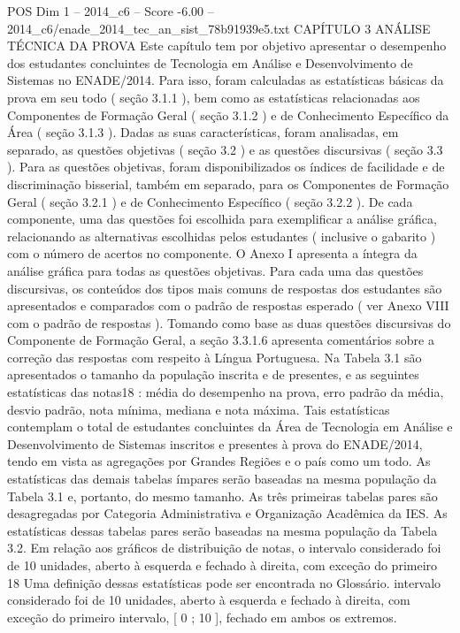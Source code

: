 \begin{textsample}{POS Dim 1 – 2014\_c6 – Score -6.00 – 2014\_c6/enade\_2014\_tec\_an\_sist\_78b91939e5.txt}  \label{ex:f1_pos_421}
CAPÍTULO 3 ANÁLISE TÉCNICA DA PROVA Este capítulo tem por objetivo apresentar o desempenho dos estudantes concluintes de Tecnologia em Análise e Desenvolvimento de Sistemas no ENADE/2014.
Para isso, foram calculadas as estatísticas básicas da prova em seu todo ( seção 3.1.1 ), bem como as estatísticas relacionadas aos Componentes de Formação Geral ( seção 3.1.2 ) e de Conhecimento Específico da Área ( seção 3.1.3 ).
Dadas as suas características, foram analisadas, em separado, as questões objetivas ( seção 3.2 ) e as questões discursivas ( seção 3.3 ).
Para as questões objetivas, foram disponibilizados os índices de facilidade e de discriminação bisserial, também em separado, para os Componentes de Formação Geral ( seção 3.2.1 ) e de Conhecimento Específico ( seção 3.2.2 ).
De cada componente, uma das questões foi escolhida para exemplificar a análise gráfica, relacionando as alternativas escolhidas pelos estudantes ( inclusive o gabarito ) com o número de acertos no componente.
O Anexo I apresenta a íntegra da análise gráfica para todas as questões objetivas.
Para cada uma das questões discursivas, os conteúdos dos tipos mais comuns de respostas dos estudantes são apresentados e comparados com o padrão de respostas esperado ( ver Anexo VIII com o padrão de respostas ).
Tomando como base as duas questões discursivas do Componente de Formação Geral, a seção 3.3.1.6 apresenta comentários sobre a correção das respostas com respeito à Língua Portuguesa.
Na Tabela 3.1 são apresentados o tamanho da população inscrita e de presentes, e as seguintes estatísticas das notas18 : média do desempenho na prova, erro padrão da média, desvio padrão, nota mínima, mediana e nota máxima.
Tais estatísticas contemplam o total de estudantes concluintes da Área de Tecnologia em Análise e Desenvolvimento de Sistemas inscritos e presentes à prova do ENADE/2014, tendo em vista as agregações por Grandes Regiões e o país como um todo.
As estatísticas das demais tabelas ímpares serão baseadas na mesma população da Tabela 3.1 e, portanto, do mesmo tamanho.
As três primeiras tabelas pares são desagregadas por Categoria Administrativa e Organização Acadêmica da IES.
As estatísticas dessas tabelas pares serão baseadas na mesma população da Tabela 3.2.
Em relação aos gráficos de distribuição de notas, o intervalo considerado foi de 10 unidades, aberto à esquerda e fechado à direita, com exceção do primeiro 18 Uma definição dessas estatísticas pode ser encontrada no Glossário. intervalo considerado foi de 10 unidades, aberto à esquerda e fechado à direita, com exceção do primeiro intervalo, [ 0 ; 10 ], fechado em ambos os extremos.

\end{textsample}
